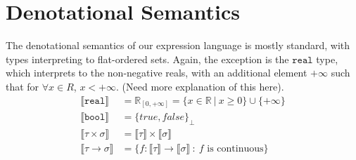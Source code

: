 \documentclass{westhesis}
\newcommand{\R}{\mathbb{R}}
\begin{document}
\section{Denotational Semantics}
The denotational semantics of our expression language is mostly standard, with types interpreting to flat-ordered sets. Again, 
the exception is the $\texttt{real}$ type, which interprets to the non-negative reals, with an additional element $+\infty$ such 
that for $\forall x \in R$, $x<+\infty$. (Need more explanation of this here).
 \begin{align*}
\llbracket \texttt{real} \rrbracket &= \R_{[0, +\infty]} = \{x \in \R \ | \ x \geq 0\} \cup \{+\infty\} \\
 \llbracket \texttt{bool} \rrbracket &= {\{true, false\}}_{\perp} \\
 \llbracket \tau \times \sigma \rrbracket &= \llbracket \tau \rrbracket \times \llbracket \sigma \rrbracket  \\
 \llbracket \tau \rightarrow \sigma \rrbracket &= \{f: \llbracket \tau \rrbracket \rightarrow \llbracket \sigma \rrbracket \ : 
 \ f \text{ is continuous}\}
 \end{align*}
\end{document}
